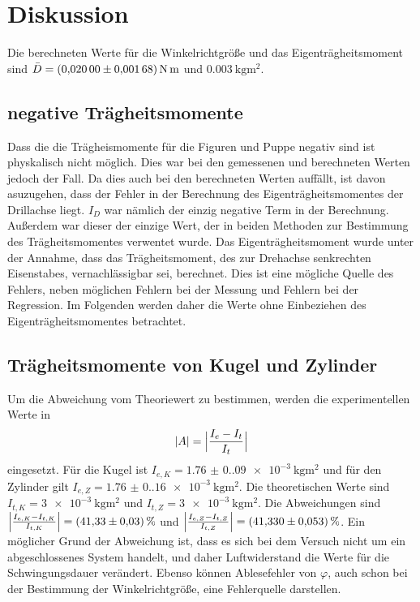 \section{Diskussion}
\label{sec:Diskussion}

    Die berechneten Werte für die Winkelrichtgröße und das Eigenträgheitsmoment sind $\bar{D}=\qty{0,02(0,00168)}{\newton\meter}$ und  $\qty{0,003}{\kilo\gram\meter\squared}$. 

    \subsection{negative Trägheitsmomente}
    Dass die die Trägheismomente für die Figuren und Puppe negativ sind ist physkalisch nicht möglich.
    Dies war bei den gemessenen und berechneten Werten jedoch der Fall.
    Da dies auch bei den berechneten Werten auffällt, ist davon asuzugehen, dass der Fehler in der Berechnung des Eigenträgheitsmomentes der Drillachse liegt.
    $I_D$ war nämlich der einzig negative Term in der Berechnung.
    Außerdem war dieser der einzige Wert, der in beiden Methoden zur Bestimmung des Trägheitsmomentes verwentet wurde.
    Das Eigenträgheitsmoment wurde unter der Annahme, dass das Trägheitsmoment, des zur Drehachse senkrechten Eisenstabes, vernachlässigbar sei, berechnet.
    Dies ist eine mögliche Quelle des Fehlers, neben möglichen Fehlern bei der Messung und Fehlern bei der Regression.
    Im Folgenden werden daher die Werte ohne Einbeziehen des Eigenträgheitsmomentes betrachtet.

    \subsection{Trägheitsmomente von Kugel und Zylinder}
    Um die Abweichung vom Theoriewert zu bestimmen, werden die experimentellen Werte in
    \begin{equation}
        |A|=\Bigl|\frac{I_e-I_t}{I_t}\Bigr|
        \label{eqn:abweichung}
    \end{equation}
    eingesetzt.
    Für die Kugel ist $I_{e,K}=\qty{1.76(0.09)e-3}{\kilo\gram\meter\squared}$ und für den Zylinder gilt $I_{e,Z}=\qty{1.76(0.16)e-3}{\kilo\gram\meter\squared}$.
    Die theoretischen Werte sind $I_{t,K}=\qty{3e-3}{\kilo\gram\meter\squared}$ und $I_{t,Z}=\qty{3e-3}{\kilo\gram\meter\squared}$.
    Die Abweichungen sind $\Bigl|\frac{I_{e,K}-I_{t,K}}{I_{t,K}}\Bigr|=\qty{41.33(0.03)}{\percent}$ und $\Bigl|\frac{I_{e,Z}-I_{t,Z}}{I_{t,Z}}\Bigr|=\qty{41.33(0.053)}{\percent}$.
    Ein möglicher Grund der Abweichung ist, dass es sich bei dem Versuch nicht um ein abgeschlossenes System handelt, und daher Luftwiderstand die Werte für die Schwingungsdauer verändert.
    Ebenso können Ablesefehler von $\varphi$, auch schon bei der Bestimmung der Winkelrichtgröße, eine Fehlerquelle darstellen.

